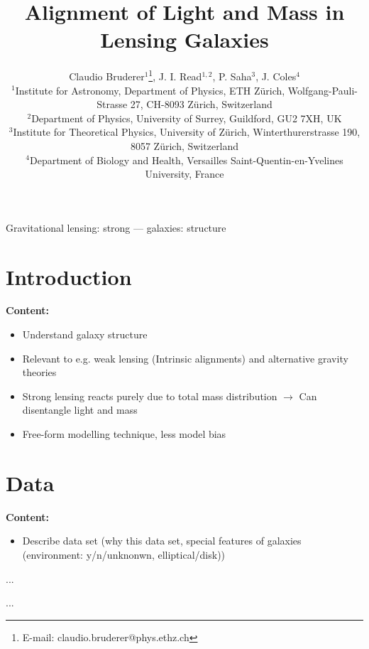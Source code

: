 \documentclass[useAMS,usenatbib]{mn2e}
\title[Alignment of Light and Mass in Lensing Galaxies]{Alignment of Light and Mass in Lensing Galaxies}
\author[Bruderer]{Claudio Bruderer$^{1}$\thanks{E-mail: claudio.bruderer@phys.ethz.ch}, J. I. Read$^{1,2}$, P. Saha$^{3}$, J. Coles$^{4}$\\
$^{1}$Institute for Astronomy, Department of Physics, ETH Z\"urich, Wolfgang-Pauli-Strasse 27, CH-8093 Z\"urich, Switzerland\\
$^{2}$Department of Physics, University of Surrey, Guildford, GU2 7XH, UK\\
$^{3}$Institute for Theoretical Physics, University of Z\"urich, Winterthurerstrasse 190, 8057 Z\"urich, Switzerland\\
$^{4}$Department of Biology and Health, Versailles Saint-Quentin-en-Yvelines University, France
}
\begin{document}
\maketitle

\begin{abstract}
\end{abstract}

\begin{keywords}
Gravitational lensing: strong --- galaxies: structure
\end{keywords}


\section{Introduction}\label{sec:introduction}
\textbf{Content:}
\begin{itemize}
\item Understand galaxy structure
\item Relevant to e.g. weak lensing (Intrinsic alignments) and alternative gravity theories
\item Strong lensing reacts purely due to total mass distribution $\rightarrow$ Can disentangle light and mass
\item Free-form modelling technique, less model bias
\end{itemize}


\section{Data}\label{sec:data}
\textbf{Content:}
\begin{itemize}
\item Describe data set (why this data set, special features of galaxies (environment: y/n/unknonwn, elliptical/disk))
\end{itemize}

\begin{table}
  \begin{center}
    \begin{tabular}
      ...
    \end{tabular}
    \caption[width=\linewidth]{Table with lens properties}
    \label{tab:lensproperties}
  \end{center}
\end{table}

\begin{table}
  \begin{center}
    \begin{tabular}
      ...
    \end{tabular}
    \caption[width=\linewidth]{Table with lens properties relevant for modelling (point masses, positions, time delays)}
    \label{tab:lensmodelling}
  \end{center}
\end{table}
\end{document}
